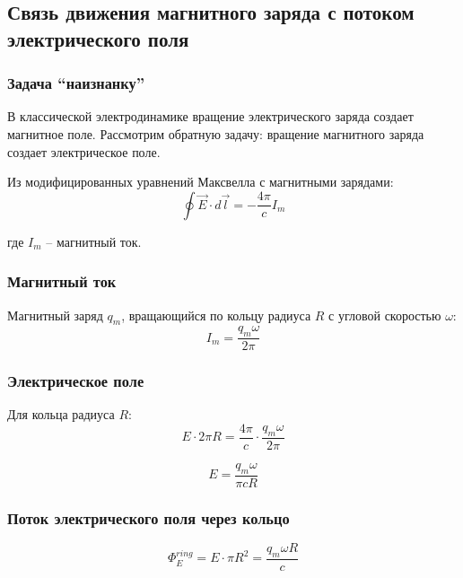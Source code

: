 \documentclass[12pt,a4paper]{article}
\begin{document}
\subsection{Связь движения магнитного заряда с потоком электрического поля}

\subsubsection{Задача ``наизнанку''}

В классической электродинамике вращение электрического заряда создает магнитное поле. Рассмотрим обратную задачу: вращение магнитного заряда создает электрическое поле.

Из модифицированных уравнений Максвелла с магнитными зарядами:
\begin{equation}
\oint \vec{E} \cdot d\vec{l} = -\frac{4\pi}{c} I_m
\end{equation}

где $I_m$ -- магнитный ток.

\subsubsection{Магнитный ток}

Магнитный заряд $q_m$, вращающийся по кольцу радиуса $R$ с угловой скоростью $\omega$:
\begin{equation}
I_m = \frac{q_m \omega}{2\pi}
\end{equation}

\subsubsection{Электрическое поле}

Для кольца радиуса $R$:
\begin{equation}
E \cdot 2\pi R = \frac{4\pi}{c} \cdot \frac{q_m \omega}{2\pi}
\end{equation}

\begin{equation}
E = \frac{q_m \omega}{\pi c R}
\label{eq:e_field}
\end{equation}

\subsubsection{Поток электрического поля через кольцо}

\begin{equation}
\Phi_E^{ring} = E \cdot \pi R^2 = \frac{q_m \omega R}{c}
\end{equation}
\end{document}

